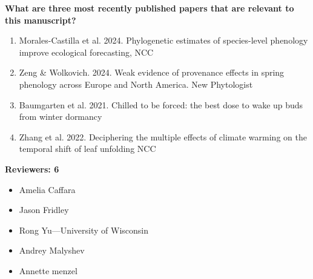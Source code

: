 \documentclass{letter}
\begin{document}
\textbf{What are three most recently published papers that are relevant to this manuscript?}\\
\begin{enumerate}
\item Morales-Castilla et al. 2024. Phylogenetic estimates of species-level phenology improve ecological forecasting, NCC\\
\item Zeng \& Wolkovich. 2024. Weak evidence of provenance effects in spring phenology across Europe and North America. New Phytologist\\
\item Baumgarten et al. 2021. Chilled to be forced: the best dose to wake up buds from winter dormancy\\
\item Zhang et al. 2022. Deciphering the multiple effects of climate warming on the temporal shift of leaf unfolding NCC\\
\end{enumerate}

\textbf{Reviewers: 6}

\begin{itemize}
\item Amelia Caffara
\item Jason Fridley 
\item Rong Yu---University of Wisconsin 
\item Andrey Malyshev
\item Annette menzel
\end{itemize}




\end{document}
